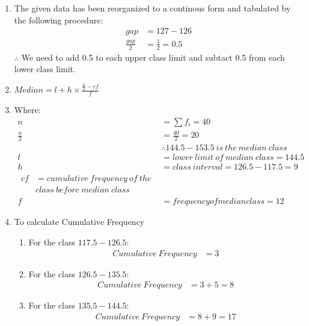 \renewcommand{\theequation}{\theenumi}

\begin{enumerate}

\item The given data has been reorganized to a continous form and tabulated by the following procedure:
\begin{align*}
gap &= 127-126\\
\frac{gap}{2} &= \frac{1}{2} = 0.5 
\end{align*}
$\therefore$ We need to add 0.5 to each upper class limit and subtact 0.5 from each lower class limit. 

\item $Median = l + h \times \frac{\frac{n}{2} - cf}{f} $

\item Where:
\begin{align*}
n &= \sum f_i = 40 \\
\frac{n}{2} &= \frac{40}{2} = 20\\
&\therefore 144.5-153.5\ is\ the\ median\ class\\
l &= lower\ limit\ of\ median\ class = 144.5\\
h &= class\ interval = 126.5 - 117.5 = 9 \\
\begin{split}
cf &= cumulative\ frequency\ of\ the \\
&class\ before\ median\ class 
\end{split}\\
f &= frequency of median class = 12
\end{align*}

\item To calculate Cumulative Frequency 
\begin{enumerate}

\item For the class $117.5-126.5$:
\begin{align*}
Cumulative\ Frequency &= 3
\end{align*}

\item For the class $126.5-135.5$:
\begin{align*}
Cumulative\ Frequency &= 3 + 5 = 8
\end{align*}

\item For the class $135.5-144.5$:
\begin{align*}
Cumulative\ Frequency &= 8 + 9 = 17 
\end{align*}


\end{enumerate}
\end{enumerate}
